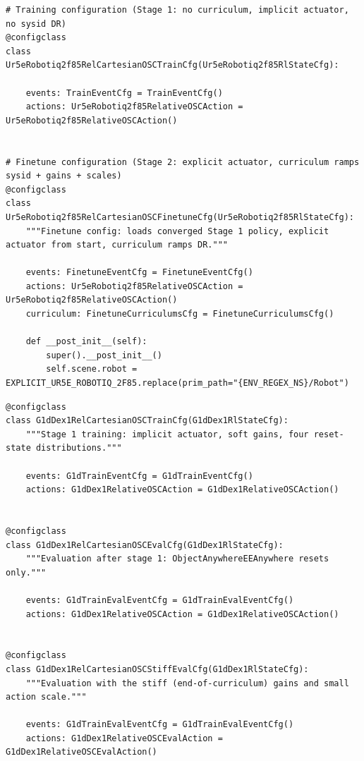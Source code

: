 \begin{snippetbox}[11]
\begin{lstlisting}[firstnumber=728]
# Training configuration (Stage 1: no curriculum, implicit actuator, no sysid DR)
@configclass
class Ur5eRobotiq2f85RelCartesianOSCTrainCfg(Ur5eRobotiq2f85RlStateCfg):

    events: TrainEventCfg = TrainEventCfg()
    actions: Ur5eRobotiq2f85RelativeOSCAction = Ur5eRobotiq2f85RelativeOSCAction()


# Finetune configuration (Stage 2: explicit actuator, curriculum ramps sysid + gains + scales)
@configclass
class Ur5eRobotiq2f85RelCartesianOSCFinetuneCfg(Ur5eRobotiq2f85RlStateCfg):
    """Finetune config: loads converged Stage 1 policy, explicit actuator from start, curriculum ramps DR."""

    events: FinetuneEventCfg = FinetuneEventCfg()
    actions: Ur5eRobotiq2f85RelativeOSCAction = Ur5eRobotiq2f85RelativeOSCAction()
    curriculum: FinetuneCurriculumsCfg = FinetuneCurriculumsCfg()

    def __post_init__(self):
        super().__post_init__()
        self.scene.robot = EXPLICIT_UR5E_ROBOTIQ_2F85.replace(prim_path="{ENV_REGEX_NS}/Robot")
\end{lstlisting}
\end{snippetbox}
\begin{snippetbox}[11]
\begin{lstlisting}[firstnumber=202]
@configclass
class G1dDex1RelCartesianOSCTrainCfg(G1dDex1RlStateCfg):
    """Stage 1 training: implicit actuator, soft gains, four reset-state distributions."""

    events: G1dTrainEventCfg = G1dTrainEventCfg()
    actions: G1dDex1RelativeOSCAction = G1dDex1RelativeOSCAction()


@configclass
class G1dDex1RelCartesianOSCEvalCfg(G1dDex1RlStateCfg):
    """Evaluation after stage 1: ObjectAnywhereEEAnywhere resets only."""

    events: G1dTrainEvalEventCfg = G1dTrainEvalEventCfg()
    actions: G1dDex1RelativeOSCAction = G1dDex1RelativeOSCAction()


@configclass
class G1dDex1RelCartesianOSCStiffEvalCfg(G1dDex1RlStateCfg):
    """Evaluation with the stiff (end-of-curriculum) gains and small action scale."""

    events: G1dTrainEvalEventCfg = G1dTrainEvalEventCfg()
    actions: G1dDex1RelativeOSCEvalAction = G1dDex1RelativeOSCEvalAction()
\end{lstlisting}
\end{snippetbox}

